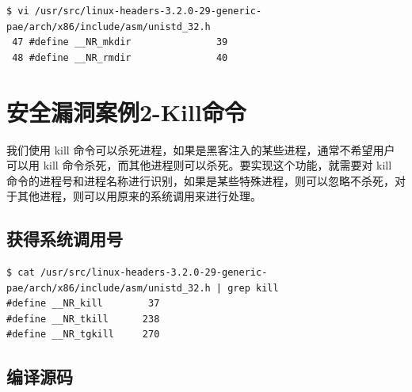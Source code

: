 {\begin{shaded}\begin{verbatim}
$ vi /usr/src/linux-headers-3.2.0-29-generic-pae/arch/x86/include/asm/unistd_32.h 
 47 #define __NR_mkdir               39
 48 #define __NR_rmdir               40
\end{verbatim}\end{shaded}}
\section{安全漏洞案例2-Kill命令}

我们使用 kill
命令可以杀死进程，如果是黑客注入的某些进程，通常不希望用户可以用 kill
命令杀死，而其他进程则可以杀死。要实现这个功能，就需要对 kill
命令的进程号和进程名称进行识别，如果是某些特殊进程，则可以忽略不杀死，对于其他进程，则可以用原来的系统调用来进行处理。

\subsection{获得系统调用号}

{\begin{shaded}\begin{verbatim}
$ cat /usr/src/linux-headers-3.2.0-29-generic-pae/arch/x86/include/asm/unistd_32.h | grep kill
#define __NR_kill        37
#define __NR_tkill      238
#define __NR_tgkill     270
\end{verbatim}\end{shaded}}
\subsection{编译源码}

